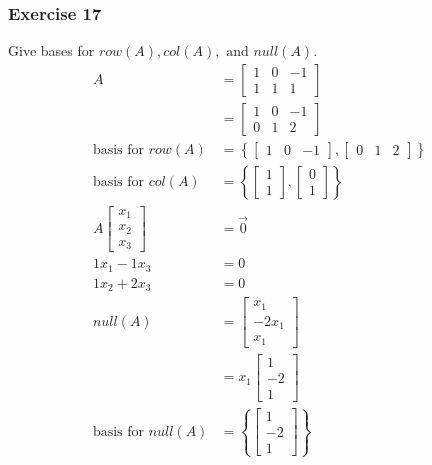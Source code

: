 \documentclass{math}
\begin{document}
\subsubsection*{Exercise 17}
Give bases for \( row(A), col(A), \text{ and } null(A) \).
\begin{align*}
  A &= \begin{bmatrix}1 & 0 & -1 \\ 1 & 1 & 1\end{bmatrix} \\
  &= \begin{bmatrix}1 & 0 & -1 \\ 0 & 1 & 2\end{bmatrix} \\
  \text{basis for } row(A) &= \left\{\begin{bmatrix}
    1 & 0 & -1
  \end{bmatrix},\begin{bmatrix}
    0 & 1 & 2
  \end{bmatrix}\right\} \\
  \text{basis for } col(A) &= \left\{\begin{bmatrix}
    1 \\ 1
  \end{bmatrix},\begin{bmatrix}
    0 \\ 1
  \end{bmatrix}\right\} \\
  A\begin{bmatrix}x_1 \\ x_2 \\ x_3\end{bmatrix} &= \vec{0} \\
  1x_1-1x_3 &= 0 \\
  1x_2+2x_3 &= 0 \\
  null(A) &= \begin{bmatrix}x_1 \\ -2x_1 \\ x_1\end{bmatrix} \\
  &= x_1\begin{bmatrix}1 \\ -2 \\ 1\end{bmatrix} \\
  \text{basis for } null(A) &= \left\{\begin{bmatrix}
    1 \\ -2 \\ 1
  \end{bmatrix}\right\}
\end{align*}
\end{document}
